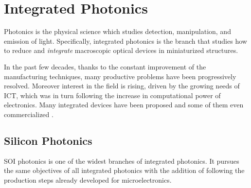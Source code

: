 \chapter{Integrated Photonics}
\label{ch:Integrated_Photonics}


Photonics is the physical science which studies detection, manipulation, and emission of light.
Specifically, integrated photonics is the branch that studies how to reduce and \textit{integrate} macroscopic optical devices in miniaturized structures.

In the past few decades, thanks to the constant improvement of the manufacturing techniques, many productive problems have been progressively resolved.
Moreover interest in the field is rising, driven by the growing needs of \acf{ICT}, which was in turn following the increase in computational power of electronics.
Many integrated devices have been proposed and some of them even commercialized \cite{thunderbolt}.


\section{Silicon Photonics}
\label{sec:Silicon_Photonics}
\ac{SOI} photonics is one of the widest branches of integrated photonics.
It pursues the same objectives of all integrated photonics with the addition of following the production steps already developed for microelectronics.

